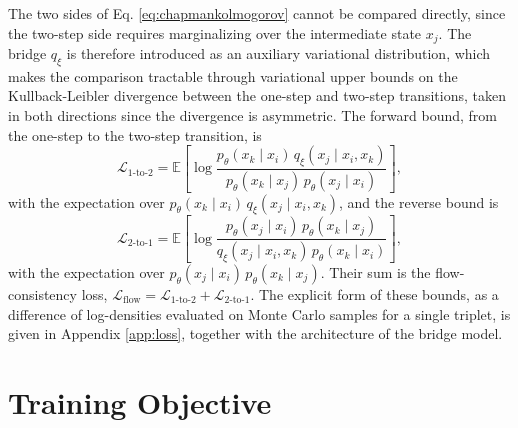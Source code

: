 The two sides of Eq. \ref{eq:chapmankolmogorov} cannot be compared directly, since the two-step side requires marginalizing over the intermediate state $x_j$. The bridge $q_\xi$ is therefore introduced as an auxiliary variational distribution, which makes the comparison tractable through variational upper bounds on the Kullback-Leibler divergence between the one-step and two-step transitions, taken in both directions since the divergence is asymmetric. The forward bound, from the one-step to the two-step transition, is
\begin{equation}
    \label{eq:flow12}
    \mathcal{L}_\mathrm{1\text{-}to\text{-}2} = \mathbb{E}\!\left[\log \frac{p_\theta(x_k \mid x_i)\, q_\xi(x_j \mid x_i, x_k)}{p_\theta(x_k \mid x_j)\, p_\theta(x_j \mid x_i)}\right],
\end{equation}
with the expectation over $p_\theta(x_k \mid x_i)\,q_\xi(x_j \mid x_i, x_k)$, and the reverse bound is
\begin{equation}
    \label{eq:flow21}
    \mathcal{L}_\mathrm{2\text{-}to\text{-}1} = \mathbb{E}\!\left[\log \frac{p_\theta(x_j \mid x_i)\, p_\theta(x_k \mid x_j)}{q_\xi(x_j \mid x_i, x_k)\, p_\theta(x_k \mid x_i)}\right],
\end{equation}
with the expectation over $p_\theta(x_j \mid x_i)\,p_\theta(x_k \mid x_j)$. Their sum is the flow-consistency loss, $\mathcal{L}_\mathrm{flow} = \mathcal{L}_\mathrm{1\text{-}to\text{-}2} + \mathcal{L}_\mathrm{2\text{-}to\text{-}1}$. The explicit form of these bounds, as a difference of log-densities evaluated on Monte Carlo samples for a single triplet, is given in Appendix \ref{app:loss}, together with the architecture of the bridge model.


\section{Training Objective}
\label{sec:objective}

